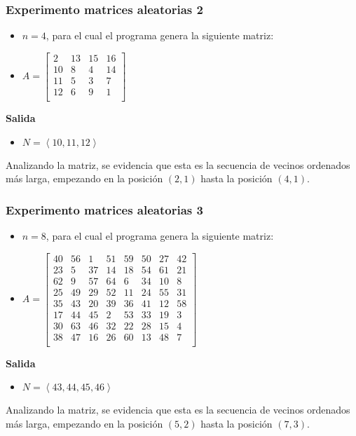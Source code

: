 \documentclass[letter]{article}
\begin{document}
\subsubsection{Experimento matrices aleatorias 2}

\begin{itemize}
    \item $n = 4$, para el cual el programa genera la siguiente matriz:
    \item $ A = 
        \begin{bmatrix}
         2 & 13 & 15 & 16 \\
        10 &  8 &  4 & 14 \\
        11 &  5 &  3 &  7 \\
        12 &  6 &  9 &  1 \\
        \end{bmatrix}
    $
\end{itemize}

\textbf{Salida} \par

\begin{itemize}
    \item $N = \left< 10, 11, 12 \right>$
\end{itemize}

Analizando la matriz, se evidencia que esta es la secuencia de vecinos ordenados más larga, empezando en la posición $(2,1)$ hasta la posición $(4,1)$. \par

\subsubsection{Experimento matrices aleatorias 3}

\begin{itemize}
    \item $n = 8$, para el cual el programa genera la siguiente matriz:
    \item $ A = 
        \begin{bmatrix}
        40 & 56 &  1 & 51 & 59 & 50 & 27 & 42 \\
        23 &  5 & 37 & 14 & 18 & 54 & 61 & 21 \\
        62 &  9 & 57 & 64 &  6 & 34 & 10 &  8 \\
        25 & 49 & 29 & 52 & 11 & 24 & 55 & 31 \\
        35 & 43 & 20 & 39 & 36 & 41 & 12 & 58 \\
        17 & 44 & 45 &  2 & 53 & 33 & 19 &  3 \\
        30 & 63 & 46 & 32 & 22 & 28 & 15 &  4 \\
        38 & 47 & 16 & 26 & 60 & 13 & 48 &  7 \\
        \end{bmatrix}
    $
\end{itemize}

\textbf{Salida} \par

\begin{itemize}
    \item $N = \left< 43, 44, 45, 46 \right>$
\end{itemize}

Analizando la matriz, se evidencia que esta es la secuencia de vecinos ordenados más larga, empezando en la posición $(5,2)$ hasta la posición $(7,3)$. \par
\end{document}
